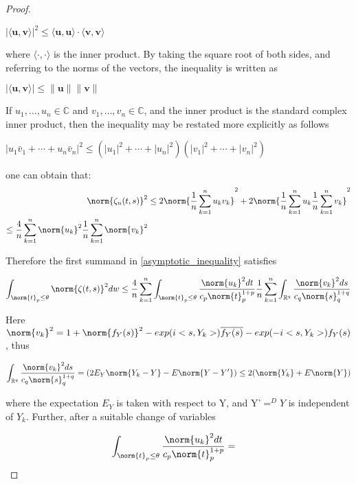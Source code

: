 \begin{proof}
\begin{prop}
$|\langle \mathbf {u} ,\mathbf {v} \rangle |^{2}\leq \langle \mathbf {u} ,\mathbf {u} \rangle \cdot \langle \mathbf {v} ,\mathbf {v} \rangle $

where $ \langle \cdot ,\cdot \rangle $ is the inner product. By taking the square root of both sides, and referring to the norms of the vectors, the inequality is written as \cite{C-S-B_inequality1}\cite{C-S-B_inequality2}

$ |\langle \mathbf {u} ,\mathbf {v} \rangle |\leq \|\mathbf {u} \|\|\mathbf {v} \|$

If $ u_{1},\ldots ,u_{n}\in \mathbb {C} $ and $ v_{1},\ldots ,v_{n}\in \mathbb {C} $, and the inner product is the standard complex inner product, then the inequality may be restated more explicitly as follows 

$ |u_{1}{\bar {v}}_{1}+\cdots +u_{n}{\bar {v}}_{n}|^{2}\leq (|u_{1}|^{2}+\cdots +|u_{n}|^{2})(|v_{1}|^{2}+\cdots +|v_{n}|^{2})$

\end{prop} 

one can obtain that:
\begin{equation}{}
\begin{split}
\norm{\zeta_{n}(t,s)}^{2}&
\leq 2 \norm{\frac{1}{n}\sum_{k=1}^{n}u_{k}v_{k}}^{2} + 2\norm{\frac{1}{n}\sum_{k=1}^{n}u_{k}\frac{1}{n}\sum_{k=1}^{n}v_{k}}^{2} \\
\leq \frac{4}{n}\sum_{k=1}^{n}\norm{u_{k}}^{2}\frac{1}{n}\sum_{k=1}^{n}\norm{v_{k}}^{2}
\end{split}
\end{equation}

Therefore the first summand in \ref{asymptotic_inequality} satisfies

$$
\int_{\norm{t}_{p}\leq\theta}\norm{\zeta(t,s)}^{2}dw \leq \frac{4}{n}\sum_{k=1}^{n}\int_{\norm{t}_{p}\leq\theta} \frac{\norm{u_{k}}^{2}dt}{c_{p}\norm{t}^{1+p}_{p}}\frac{1}{n}\sum_{k=1}^{n}\int_{\mathbb{R}^{q}}\frac{\norm{v_{k}}^{2}ds}{c_{q}\norm{s}^{1+q}_{q}}
$$

Here $\norm{v_{k}}^{2} = 1 + \norm{f_{Y}(s)}^{2}- exp(i<s,Y_{k}>)\overline{f_{Y}(s)} - exp(-i<s,Y_{k}>)f_{Y}(s)$, thus

$$
\int_{\mathbb{R}^{q}}\frac{\norm{v_{k}}^{2}ds}{c_{q}\norm{s}^{1+q}_{q}} = (2E_{Y}\norm{Y_{k}-Y}- E\norm{Y-Y'}) \leq 2(\norm{Y_{k}}+E\norm{Y})
$$

where the expectation $E_{Y}$ is taken with respect to Y, and Y'$=^{D}Y$ is independent of $Y_{k}$. Further, after a suitable change of variables

\begin{equation}{}
\begin{split}
\int_{\norm{t}_{p}\leq\theta} \frac{\norm{u_{k}}^{2}dt}{c_{p}\norm{t}^{1+p}_{p}} &
= 
\end{split}
\end{equation}
\end{proof}





